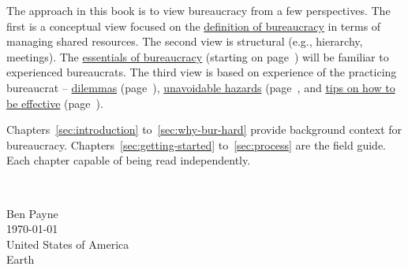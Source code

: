 The approach in this book is to view bureaucracy from a few perspectives. The first is a conceptual view focused on the \hyperref[sec:define-bureaucracy]{definition of bureaucracy} in terms of managing shared resources. The second view is structural (e.g., hierarchy, meetings). The \hyperref[sec:fundamentals-of-b]{essentials of bureaucracy} (starting on page~\pageref{sec:fundamentals-of-b})
will be familiar to experienced bureaucrats. 
The third view is based on experience of the practicing bureaucrat -- \hyperref[sec:dilemma-trilemma]{dilemmas} (page~\pageref{sec:dilemma-trilemma}), \hyperref[sec:unavoidable-hazards]{unavoidable hazards} (page~\pageref{sec:unavoidable-hazards}, and \hyperref[sec:effective-bureaucrat]{tips on how to be effective} (page~\pageref{sec:effective-bureaucrat}). 



Chapters~\ref{sec:introduction} to~\ref{sec:why-bur-hard} provide background context for bureaucracy. 
Chapters~\ref{sec:getting-started} to~\ref{sec:process} are the field guide. 
Each chapter capable of being read independently. 



\ \\

\begin{flushright}
Ben Payne\\
\today\\
United States of America\\
Earth
\end{flushright}


